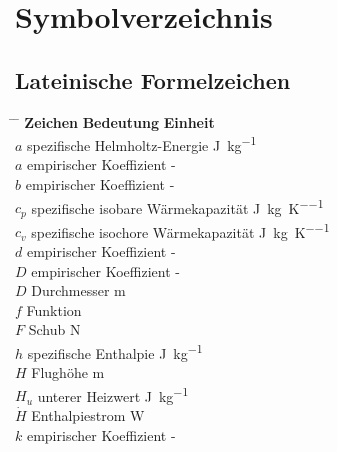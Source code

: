 ﻿\chapter*{Symbolverzeichnis}

\section*{Lateinische Formelzeichen}

\begin{tabbing}
	\hspace*{3cm} \= \hspace*{8cm} \= \hspace*{2cm}\kill
	\textbf{Zeichen} \> \textbf{Bedeutung} 				\>	\textbf{Einheit}		\\[5mm]
	$a$         \>  spezifische Helmholtz-Energie       \> \si{\J\per\kg}	 \\
    $a$         \>  empirischer Koeffizient             \>  -  \\
    $b$         \>  empirischer Koeffizient             \>  -  \\
    $c_p$       \>  spezifische isobare Wärmekapazität  \>  \si{\J\per\kg\per\K}	 \\
    $c_v$       \>  spezifische isochore Wärmekapazität \>  \si{\J\per\kg\per\K} \\
    $d$         \>  empirischer Koeffizient             \>  -  \\
    $D$         \>  empirischer Koeffizient             \>  -  \\
    $D$         \>  Durchmesser                         \>  \si{\m}  \\
    $f$         \>  Funktion                            \>   \\
    $F$         \>  Schub                               \>  \si{\N}  \\
    $h$         \>  spezifische Enthalpie               \>  \si{\J\per\kg} \\
    $H$         \>  Flughöhe                            \>  \si{\m} \\
    $H_u$       \>  unterer Heizwert                    \>  \si{\J\per\kg} \\
    $\dot{H}$   \>  Enthalpiestrom                      \>  \si{\W}   \\
    $k$         \>  empirischer Koeffizient             \>  -   \\

\end{tabbing}
